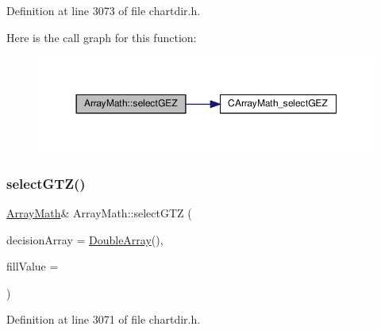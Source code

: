 Definition at line 3073 of file chartdir.\+h.

Here is the call graph for this function\+:
\nopagebreak
\begin{figure}[H]
\begin{center}
\leavevmode
\includegraphics[width=350pt]{class_array_math_adeaae3c00b4d38c471d5956d65861a48_cgraph}
\end{center}
\end{figure}
\mbox{\label{class_array_math_aadfd40e8527d58dc41cceec240d1f9b8}} 
\subsubsection{\texorpdfstring{select\+G\+T\+Z()}{selectGTZ()}}
{\footnotesize\ttfamily \hyperlink{class_array_math}{Array\+Math}\& Array\+Math\+::select\+G\+TZ (\begin{DoxyParamCaption}\item[{\hyperlink{class_double_array}{Double\+Array}}]{decision\+Array = {\ttfamily \hyperlink{class_double_array}{Double\+Array}()},  }\item[{double}]{fill\+Value = {} }\end{DoxyParamCaption})\hspace{0.3cm}{\ttfamily [inline]}}



Definition at line 3071 of file chartdir.\+h.

